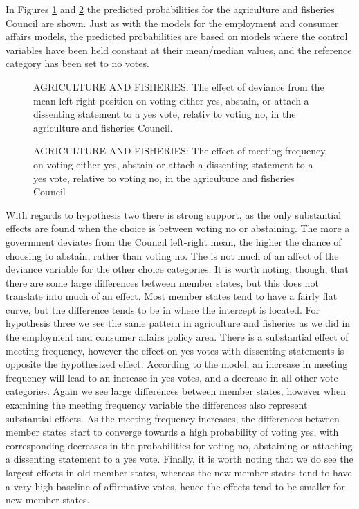 In Figures \ref{fig:devAgriPech} and \ref{fig:meetAgriPech} the predicted probabilities for the agriculture and fisheries Council are shown. Just as with the models for the employment and consumer affairs models, the predicted probabilities are based on models where the control variables have been held constant at their mean/median values, and the reference category has been set to no votes. 

\begin{figure}[htp]
  \centering
  \scalebox{.7}{
    
  }
\caption{AGRICULTURE AND FISHERIES: The effect of deviance from the mean left-right position on voting either yes, abstain, or attach a dissenting statement to a yes vote, relativ to voting no, in the agriculture and fisheries Council.}
\label{fig:devAgriPech}
\end{figure}

\begin{figure}[htp]
  \centering
  \scalebox{.7}{
    
  }
\caption{AGRICULTURE AND FISHERIES: The effect of meeting frequency on voting either yes, abstain or attach a dissenting statement to a yes vote, relative to voting no,  in the agriculture and fisheries Council}
\label{fig:meetAgriPech}
\end{figure}

With regards to hypothesis two there is strong support, as the only substantial effects are found when the choice is between voting no or abstaining. The more a government deviates from the Council left-right mean, the higher the chance of choosing to abstain, rather than voting no. The is not much of an affect of the deviance variable for the other choice categories.  It is worth noting, though, that there are some large differences between member states, but this does not translate into much of an effect. Most member states tend to have a fairly flat curve, but the difference tends to be in where the intercept is located. For hypothesis three we see the same pattern in agriculture and fisheries as we did in the employment and consumer affairs policy area. There is a substantial effect of meeting frequency, however the effect on yes votes with dissenting statements is opposite the hypothesized effect. According to the model, an increase in meeting frequency will lead to an increase in yes votes, and a decrease in all other vote categories. Again we see large differences between member states, however when examining the meeting frequency variable the differences also represent substantial effects. As the meeting frequency increases, the differences between member states start to converge towards a high probability of voting yes, with corresponding decreases in the probabilities for voting no, abstaining or attaching a dissenting statement to a yes vote. Finally, it is worth noting that we do see the largest effects in old member states, whereas the new member states tend to have a very high baseline of affirmative votes, hence the effects tend to be smaller for new member states. 

